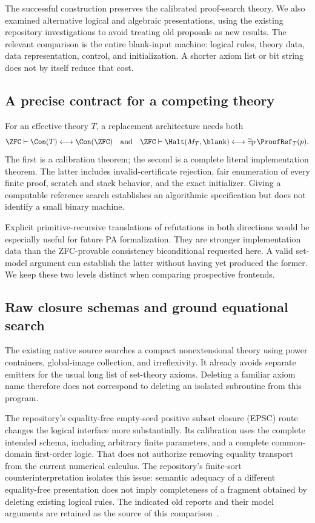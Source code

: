 The successful construction preserves the calibrated proof-search theory.
We also examined alternative logical and algebraic presentations, using
the existing repository investigations to avoid treating old proposals as
new results.  The relevant comparison is the entire blank-input machine:
logical rules, theory data, data representation, control, and initialization.
A shorter axiom list or bit string does not by itself reduce that cost.

\subsection{A precise contract for a competing theory}

For an effective theory $T$, a replacement architecture needs both
\[
 \ZFC\vdash\Con(T)\longleftrightarrow\Con(\ZFC)
 \quad\hbox{and}\quad
 \ZFC\vdash\Halt(M_T,\blank)
              \longleftrightarrow\exists p\,\ProofRef_T(p).
\]
The first is a calibration theorem; the second is a complete literal
implementation theorem.  The latter includes invalid-certificate rejection,
fair enumeration of every finite proof, scratch and stack behavior, and
the exact initializer.  Giving a computable reference search establishes
an algorithmic specification but does not identify a small binary machine.

Explicit primitive-recursive translations of refutations in both
directions would be especially useful for future PA formalization.
They are stronger implementation data than the ZFC-provable consistency
biconditional requested here.  A valid set-model argument can establish
the latter without having yet produced the former.  We keep these two
levels distinct when comparing prospective frontends.

\subsection{Raw closure schemas and ground equational search}

The existing native source searches a compact nonextensional theory
using power containers, global-image collection, and irreflexivity.  It
already avoids separate emitters for the usual long list of set-theory
axioms.  Deleting a familiar axiom name therefore does not correspond to
deleting an isolated subroutine from this program.

The repository's equality-free empty-seed positive subset closure (EPSC)
route changes the logical interface more substantially.  Its calibration
uses the complete intended schema, including arbitrary finite parameters,
and a complete common-domain first-order logic.  That does not authorize
removing equality transport from the current numerical calculus.  The
repository's finite-sort counterinterpretation isolates this issue:
semantic adequacy of a different equality-free presentation does not
imply completeness of a fragment obtained by deleting existing logical
rules.  The indicated old reports and their model arguments are retained
as the source of this comparison~\cite{coordinated239,boundary239}.

